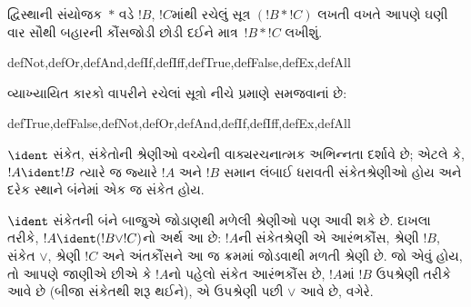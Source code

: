 \documentclass[../../../include/open-logic-section]{subfiles}
\begin{document}
દ્વિસ્થાની સંયોજક~$\ast$ વડે $!B$, $!C$માંથી રચેલું સૂત્ર
$(!B \ast !C)$ લખતી વખતે આપણે ઘણી વાર સૌથી બહારની કૌંસજોડી છોડી
દઈને માત્ર~$!B \ast !C$ લખીશું.

\begin{tagblock}{defNot,defOr,defAnd,defIf,defIff,defTrue,defFalse,defEx,defAll}
\begin{defn}
વ્યાખ્યાયિત કારકો વાપરીને રચેલાં સૂત્રો નીચે પ્રમાણે સમજવાનાં છે:

\begin{tagenumerate}{defTrue,defFalse,defNot,defOr,defAnd,defIf,defIff,defEx,defAll}







\end{tagenumerate}
\end{defn}
\end{tagblock}

\begin{defn}[વાક્યરચનાત્મક અભિન્નતા]
$\ident$ સંકેત, સંકેતોની શ્રેણીઓ વચ્ચેની વાક્યરચનાત્મક અભિન્નતા
દર્શાવે છે; એટલે કે, $!A \ident !B$ ત્યારે જ જ્યારે $!A$ અને $!B$
સમાન લંબાઈ ધરાવતી સંકેતશ્રેણીઓ હોય અને દરેક સ્થાને બંનેમાં એક જ
સંકેત હોય.
\end{defn}

$\ident$ સંકેતની બંને બાજુએ જોડાણથી મળેલી શ્રેણીઓ પણ આવી શકે છે.
દાખલા તરીકે, $!A \ident (!B \lor !C)$નો અર્થ આ છે: $!A$ની
સંકેતશ્રેણી એ આરંભકૌંસ, શ્રેણી $!B$, સંકેત $\lor$, શ્રેણી $!C$ અને
અંતકૌંસને આ જ ક્રમમાં જોડવાથી મળતી શ્રેણી છે. જો એવું હોય, તો આપણે
જાણીએ છીએ કે $!A$નો પહેલો સંકેત આરંભકૌંસ છે, $!A$માં $!B$ ઉપશ્રેણી
તરીકે આવે છે (બીજા સંકેતથી શરૂ થઈને), એ ઉપશ્રેણી પછી $\lor$ આવે છે,
વગેરે.
\end{document}
